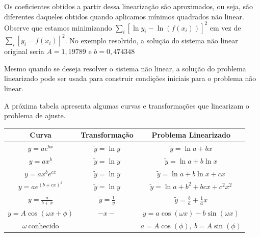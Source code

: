 \begin{obs}
Os coeficientes obtidos a partir dessa linearização são aproximados, ou seja, são diferentes daqueles obtidos quando aplicamos mínimos quadrados não linear. Observe que estamos minimizando $\displaystyle\sum_i [\ln y_i -\ln (f(x_i))]^2$ em vez de $\displaystyle\sum_i [ y_i -f(x_i)]^2$. No exemplo resolvido, a solução do sistema não linear original seria $A=1,19789$ e $b=0,474348$
\end{obs}

\begin{obs}
Mesmo quando se deseja resolver o sistema não linear, a solução do problema linearizado pode ser usada para construir condições iniciais para o problema não linear.
\end{obs}


A próxima tabela apresenta algumas curvas e transformações que linearizam o problema de ajuste.
\begin{center}
  \begin{tabular}{|c|c|c|}\hline
Curva    & Transformação & Problema Linearizado\\ \hline
$\displaystyle y=ae^{bx}$       & $\tilde y=\ln y$   & $\tilde y=\ln a+ bx$\\
$\displaystyle y=ax^b $       &$\tilde y=\ln y$   & $\tilde y=\ln a+ b\ln x$\\
$\displaystyle y=ax^be^{cx}$    &$\tilde y=\ln y$  & $\tilde y=\ln a+ b\ln x+cx$\\
$\displaystyle y=ae^{(b+cx)^2}$ &$\tilde y=\ln y$       & $\tilde y=\ln a+b^2+ bc x+c^2x^2$\\
$\displaystyle y=\frac{a}{b+x}$ &$\displaystyle \tilde y=\frac{1}{y}$ & $\displaystyle \tilde y=\frac{b}{a}+\frac{1}{a}x$\\
$y=A\cos(\omega x+\phi)$   & $-x-$ &  $y=a\cos(\omega x)-b\sin(\omega x)$ \\
$\omega\ \text{conhecido} $&   &  $a=A\cos(\phi),\ b=A\sin(\phi)$ \\ \hline    
  \end{tabular}
\end{center}

